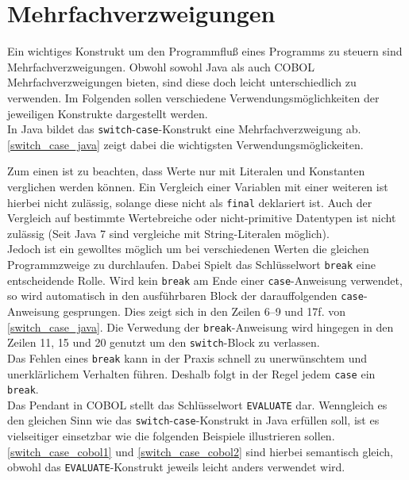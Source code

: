 \section{Mehrfachverzweigungen}
Ein wichtiges Konstrukt um den Programmfluß eines Programms zu steuern sind Mehrfachverzweigungen. Obwohl sowohl Java als auch COBOL Mehrfachverzweigungen bieten, sind diese doch leicht unterschiedlich zu verwenden. Im Folgenden sollen verschiedene Verwendungsmöglichkeiten der jeweiligen Konstrukte dargestellt werden.\\

In Java bildet das \texttt{switch}-\texttt{case}-Konstrukt eine Mehrfachverzweigung ab. \autoref{switch_case_java} zeigt dabei die wichtigsten Verwendungsmöglickeiten.


Zum einen ist zu beachten, dass Werte nur mit Literalen und Konstanten verglichen werden können. Ein Vergleich einer Variablen mit einer weiteren ist hierbei nicht zulässig, solange diese nicht als \texttt{final} deklariert ist. Auch der Vergleich auf bestimmte Wertebreiche oder nicht-primitive Datentypen ist nicht zulässig (Seit Java 7 sind vergleiche mit String-Literalen möglich).\\

Jedoch ist ein gewolltes  möglich um bei verschiedenen Werten die gleichen Programmzweige zu durchlaufen. Dabei Spielt das Schlüsselwort \texttt{break} eine entscheidende Rolle. Wird kein \texttt{break} am Ende einer \texttt{case}-Anweisung verwendet, so wird automatisch in den ausführbaren Block der darauffolgenden \texttt{case}-Anweisung gesprungen. Dies zeigt sich in den Zeilen 6--9 und 17f. von \autoref{switch_case_java}. Die Verwedung der \texttt{break}-Anweisung wird hingegen in den Zeilen 11, 15 und 20 genutzt um den \texttt{switch}-Block zu verlassen.\\ 

Das Fehlen eines \texttt{break} kann in der Praxis schnell zu unerwünschtem und unerklärlichem Verhalten führen. Deshalb folgt in der Regel jedem \texttt{case} ein \texttt{break}. \\

Das Pendant in COBOL stellt das Schlüsselwort \texttt{EVALUATE} dar. Wenngleich es den gleichen Sinn wie das \texttt{switch}-\texttt{case}-Konstrukt in Java erfüllen soll, ist es vielseitiger einsetzbar wie die folgenden Beispiele illustrieren sollen. \autoref{switch_case_cobol1} und \autoref{switch_case_cobol2} sind hierbei semantisch gleich, obwohl das \texttt{EVALUATE}-Konstrukt jeweils leicht anders verwendet wird.\\

